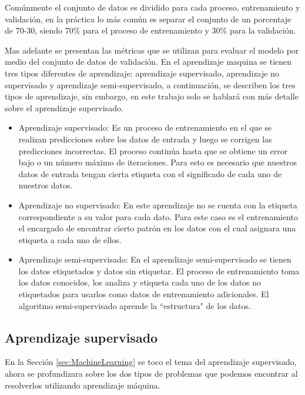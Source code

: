 Comúnmente el conjunto de datos es dividido para cada proceso, entrenamiento y validación, en la práctica lo más común es separar el conjunto de un porcentaje de 70-30, siendo 70\% para el proceso de entrenamiento y 30\% para la validación.

Mas adelante se presentan las métricas que se utilizan para evaluar el modelo por medio del conjunto de datos de validación. En el aprendizaje maquina se tienen tres tipos diferentes de aprendizaje: aprendizaje supervisado, aprendizaje no supervisado y aprendizaje semi-supervisado, a continuación, se describen los tres tipos de aprendizaje, sin embargo, en este trabajo solo se hablará con más detalle sobre el aprendizaje supervisado.

\begin{itemize}

    \item Aprendizaje supervisado: Es un proceso de entrenamiento en el que se realizan predicciones sobre los datos de entrada y luego se corrigen las predicciones incorrectas. El proceso continúa hasta que se obtiene un error bajo o un número máximo de iteraciones. Para esto es necesario que nuestros datos de entrada tengan cierta etiqueta con el significado de cada uno de nuestros datos.

    \item Aprendizaje no supervisado: En este aprendizaje no se cuenta con la etiqueta correspondiente a su valor para cada dato. Para este caso es el entrenamiento el encargado de encontrar cierto patrón en los datos con el cual asignara una etiqueta a cada uno de ellos.

    \item Aprendizaje semi-supervisado: En el aprendizaje semi-supervisado se tienen los datos etiquetados y datos sin etiquetar. El proceso de entrenamiento toma los datos conocidos, los analiza y etiqueta cada uno de los datos no etiquetados para usarlos como datos de entrenamiento adicionales. El algoritmo semi-supervisado aprende la “estructura" de los datos.

\end{itemize}


\subsection{Aprendizaje supervisado}

En la Sección \ref{sec:MachineLearning} se toco el tema del aprendizaje supervisado, ahora se profundizara sobre los dos tipos de problemas que podemos encontrar al resolverlos utilizando aprendizaje máquina.

